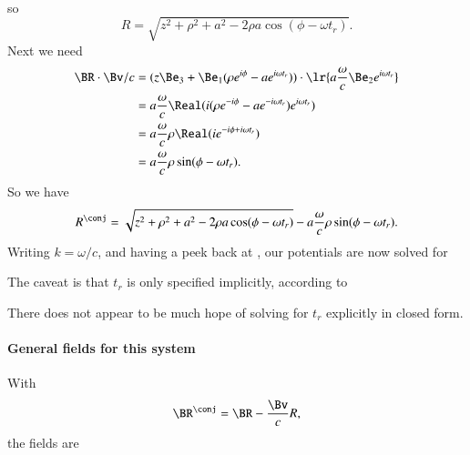 {\begin{equation}
\begin{aligned}
\end{aligned}
\end{equation}
so
\begin{equation}\label{eqn:relativisticElectrodynamicsExamReflection:130}
R = \sqrt{z^2 + \rho^2 + a^2 - 2 \rho a \cos( \phi - \omega t_r ) }.
\end{equation}
Next we need
%
\begin{equation}\label{eqn:relativisticElectrodynamicsExamReflection:1070}
\begin{aligned}
\BR \cdot \Bv/c
&=
(z \Be_3 + \Be_1 (\rho e^{i \phi} - a e^{i \omega t_r} )) \cdot
\lr{
   a \frac{\omega}{c} \Be_2 e^{i \omega t_r} 
} \\
&=
a \frac{\omega }{c}
\Real(
i (\rho e^{-i \phi} - a e^{-i \omega t_r} ) e^{i \omega t_r} ) \\
&=
a \frac{\omega }{c}
\rho \Real( i e^{-i \phi + i \omega t_r} ) \\
&=
a \frac{\omega }{c}
\rho \sin(\phi - \omega t_r).
\end{aligned}
\end{equation}
%
So we have
%
\begin{equation}\label{eqn:relativisticElectrodynamicsExamReflection:150}
R^\conj = \sqrt{z^2 + \rho^2 + a^2 - 2 \rho a \cos( \phi - \omega t_r ) }
-a \frac{\omega }{c} \rho \sin(\phi - \omega t_r).
\end{equation}
%
Writing \(k = \omega/c\), and having a peek back at , our potentials are now solved for

The caveat is that \(t_r\) is only specified implicitly, according to

There does not appear to be much hope of solving for \(t_r\) explicitly in closed form.
%
%
\paragraph{General fields for this system}
%
With
%
\begin{equation}\label{eqn:relativisticElectrodynamicsExamReflection:540}
\BR^\conj = \BR - \frac{\Bv}{c} R,
\end{equation}
the fields are

}
